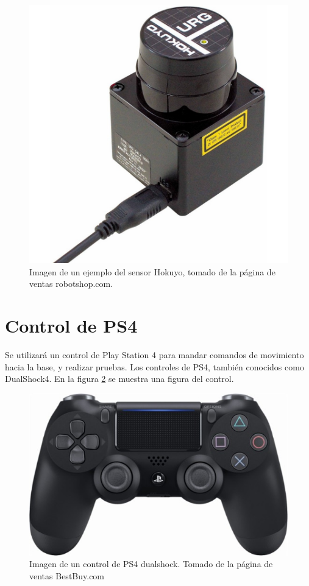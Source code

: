 \begin{figure}[H]
\centering
\includegraphics[scale=0.3]{imagenes/hokuyo.jpg}
\caption{Imagen de un ejemplo del sensor Hokuyo, tomado de la página de ventas robotshop.com.}
\label{F:hokuyofoto}
\end{figure}

\section{Control de PS4}

Se utilizará un control de Play Station 4 para mandar comandos de movimiento hacia la base, y realizar pruebas. Los controles de PS4, también conocidos como DualShock4. En la figura \ref{F:dualshock} se muestra una figura del control.

\begin{figure}[H]
\centering
\includegraphics[scale=0.5]{imagenes/dualshock4.jpg}
\caption{Imagen de un control de PS4 dualshock. Tomado de la página de ventas BestBuy.com}
\label{F:dualshock}
\end{figure}

